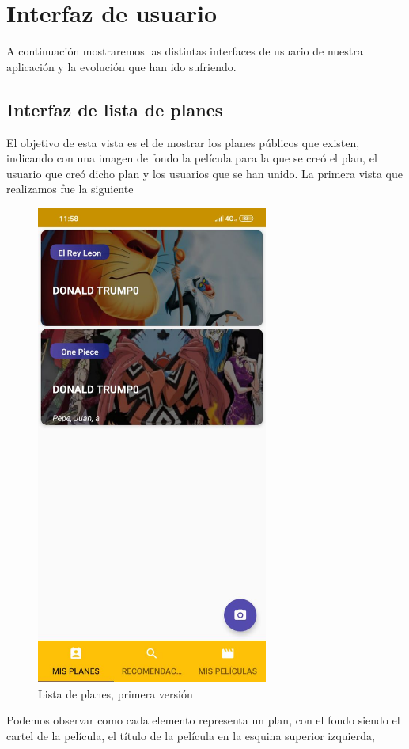 \section{Interfaz de usuario}
\label{makereference3.4}

A continuación mostraremos las distintas interfaces de usuario de nuestra aplicación y la evolución que han ido sufriendo.
\subsection{Interfaz de lista de planes}
\label{makereference3.4.1}
El objetivo de esta vista es el de mostrar los planes públicos que existen, indicando con una imagen de fondo la película para la que se creó el plan, el usuario
que creó dicho plan y los usuarios que se han unido. La primera vista que realizamos fue la siguiente
\begin{figure}[H]
    \centering
    \includegraphics[width=3in]{figures/PlansList1.jpg}
    \caption{Lista de planes, primera versión}
\end{figure}
Podemos observar como cada elemento representa un plan, con el fondo siendo el cartel de la película, el título de la película en la esquina superior izquierda,
